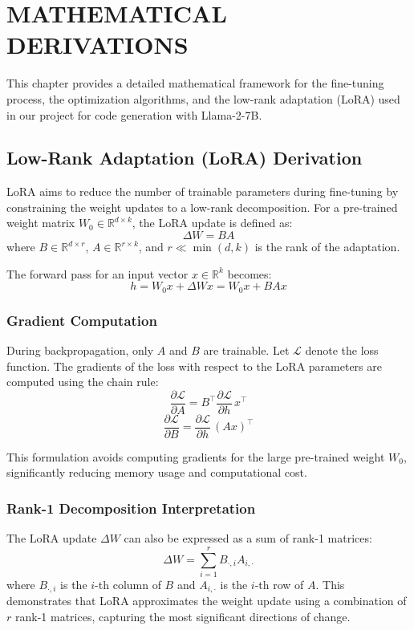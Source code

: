 \chapter{MATHEMATICAL DERIVATIONS}
This chapter provides a detailed mathematical framework for the fine-tuning process, the optimization algorithms, and the low-rank adaptation (LoRA) used in our project for code generation with Llama-2-7B.

\section{Low-Rank Adaptation (LoRA) Derivation}
LoRA aims to reduce the number of trainable parameters during fine-tuning by constraining the weight updates to a low-rank decomposition. For a pre-trained weight matrix $W_0 \in \mathbb{R}^{d \times k}$, the LoRA update is defined as:
\[
\Delta W = BA
\]
where 
$B \in \mathbb{R}^{d \times r}$, $A \in \mathbb{R}^{r \times k}$, and $r \ll \min(d,k)$ is the rank of the adaptation.  

The forward pass for an input vector $x \in \mathbb{R}^{k}$ becomes:
\[
h = W_0 x + \Delta W x = W_0 x + B A x
\]

\subsection{Gradient Computation}
During backpropagation, only $A$ and $B$ are trainable. Let $\mathcal{L}$ denote the loss function. The gradients of the loss with respect to the LoRA parameters are computed using the chain rule:
\[
\frac{\partial \mathcal{L}}{\partial A} = B^\top \frac{\partial \mathcal{L}}{\partial h} \, x^\top
\]
\[
\frac{\partial \mathcal{L}}{\partial B} = \frac{\partial \mathcal{L}}{\partial h} \, (A x)^\top
\]

This formulation avoids computing gradients for the large pre-trained weight $W_0$, significantly reducing memory usage and computational cost.

\subsection{Rank-1 Decomposition Interpretation}
The LoRA update $\Delta W$ can also be expressed as a sum of rank-1 matrices:
\[
\Delta W = \sum_{i=1}^{r} B_{\cdot,i} A_{i,\cdot}
\]
where $B_{\cdot,i}$ is the $i$-th column of $B$ and $A_{i,\cdot}$ is the $i$-th row of $A$. This demonstrates that LoRA approximates the weight update using a combination of $r$ rank-1 matrices, capturing the most significant directions of change.

